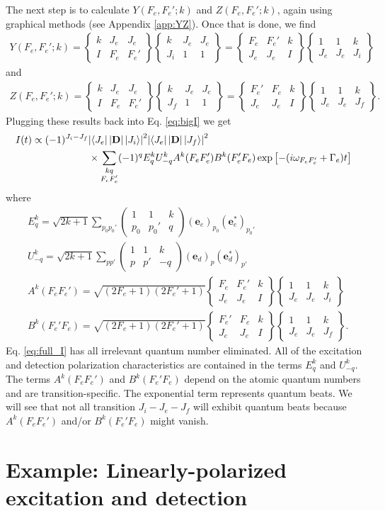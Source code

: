 \documentclass[11pt]{article}
\newcommand{\F}{\mathcal{F}}
\newcommand{\lb}{\left[}
\newcommand{\rb}{\right]}
\newcommand{\tj}[6]{ \begin{pmatrix}
		#1 & #2 & #3 \\
		#4 & #5 & #6 
\end{pmatrix}}
\newcommand{\Gj}[6]{ \begin{Bmatrix}
		#1 & #2 & #3 \\
		#4 & #5 & #6 
\end{Bmatrix}}
\begin{document}
The next step is to calculate $Y(F_e,F_e';k)$ and $Z(F_e, F_e';k)$, again using graphical methods (see Appendix \ref{app:YZ}). Once that is done, we find 
\begin{align*}
Y(F_e, F_e';k) 
=
\Gj{k}{J_e}{J_e}{I}{F_e}{F_e'} 
\Gj{k}{J_e}{J_e}{J_i}{1}{1}
=
\Gj{F_e}{F_e'}{k}{J_e}{J_e}{I} 
\Gj{1}{1}{k}{J_e}{J_e}{J_i}
\end{align*}
and
\begin{align*}
Z(F_e, F_e';k) 
=
\Gj{k}{J_e}{J_e}{I}{F_e}{F_e'} 
\Gj{k}{J_e}{J_e}{J_f}{1}{1}
=
\Gj{F_e'}{F_e}{k}{J_e}{J_e}{I} 
\Gj{1}{1}{k}{J_e}{J_e}{J_f}.
\end{align*}
Plugging these results back into Eq. \ref{eq:bigI} we get
\begin{align}\label{eq:full_I}
I(t) \propto (-1)^{J_i - J_f}&\abs{\bra{J_e} \abs{\mathbf{D}}\ket{J_i}}^2\abs{ \bra{J_e} \abs{\mathbf{D}} \ket{J_f}}^2 \nonumber\\
&\times \sum_{\substack{kq\\F_eF_e'}} 
(-1)^q E^k_q U^k_{-q}A^k(F_eF_e')B^k(F_e'F_e)\exp\lb -(i\omega_{F_eF'_e} + \Gamma_e)t \rb 
\end{align}
where
\begin{align*}
&E^k_q 
= \sqrt{2k+1} \sum_{p_0p_0'} \tj{1}{1}{k}{p_0}{p_0'}{q}
(\mathbf{e}_e)_{p_0}(\mathbf{e}^*_e)_{p_0'}\\
&U^k_{-q} 
= \sqrt{2k+1} \sum_{pp'} \tj{1}{1}{k}{p}{p'}{-q}
(\mathbf{e}_d)_{p}(\mathbf{e}_d^*)_{p'} \\
&A^k(F_eF_e') = \sqrt{(2F_e+1)(2F_e'+1)}
\Gj{F_e}{F_e'}{k}{J_e}{J_e}{I} 
\Gj{1}{1}{k}{J_e}{J_e}{J_i}\\
&B^k(F_e'F_e) = \sqrt{(2F_e+1)(2F_e'+1)}
\Gj{F_e'}{F_e}{k}{J_e}{J_e}{I} 
\Gj{1}{1}{k}{J_e}{J_e}{J_f}.
\end{align*}
Eq. \ref{eq:full_I} has all irrelevant quantum number eliminated. All of the excitation and detection polarization characteristics are contained in the terms $E^k_q$ and $U^k_{-q}$. The terms $A^k(F_eF_e')$ and $B^k(F_e'F_e)$ depend on the atomic quantum numbers and are transition-specific. The exponential term represents quantum beats. We will see that not all transition $J_i - J_e - J_f$ will exhibit quantum beats because $A^k(F_eF_e')$ and/or $B^k(F_e'F_e)$ might vanish.


\section{Example: Linearly-polarized excitation and detection}
\end{document}
